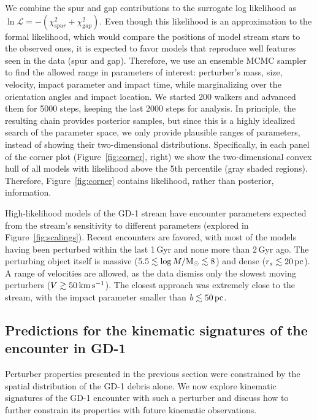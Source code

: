\documentclass[twocolumn]{aastex62}
\begin{document}
We combine the spur and gap contributions to the surrogate log likelihood as $\ln\mathcal{L} = -(\chi^2_{\mathrm spur} + \chi^2_{\mathrm gap})$.
Even though this likelihood is an approximation to the formal likelihood, which would compare the positions of model stream stars to the observed ones, it is expected to favor models that reproduce well features seen in the data (spur and gap).
Therefore, we use an ensemble MCMC sampler \citep{Foreman-Mackey:2013} to find the allowed range in parameters of interest: perturber's mass, size, velocity, impact parameter and impact time, while marginalizing over the orientation angles and impact location.
We started 200 walkers and advanced them for 5000 steps, keeping the last 2000 steps for analysis.
In principle, the resulting chain provides posterior samples, but since this is a highly idealized search of the parameter space, we only provide plausible ranges of parameters, instead of showing their two-dimensional distributions.
Specifically, in each panel of the corner plot (Figure~\ref{fig:corner}, right) we show the two-dimensional convex hull of all models with likelihood above the 5th percentile (gray shaded regions).
Therefore, Figure~\ref{fig:corner} contains likelihood, rather than posterior, information.

High-likelihood models of the GD-1 stream have encounter parameters expected from the stream's sensitivity to different parameters (explored in Figure~\ref{fig:scalings}).
Recent encounters are favored, with most of the models having been perturbed within the last 1\,Gyr and none more than 2\,Gyr ago.
The perturbing object itself is massive ($5.5\lesssim\log M/\rm M_\odot\lesssim8$) and dense ($r_s\lesssim20\,\rm pc$).
A range of velocities are allowed, as the data dismiss only the slowest moving perturbers ($V\gtrsim50\,\rm km\,s^{-1}$).
The closest approach was extremely close to the stream, with the impact parameter smaller than $b\lesssim50\rm\,pc$.


\subsection{Predictions for the kinematic signatures of the encounter in GD-1}
\label{sec:kinematics}
Perturber properties presented in the previous section were constrained by the spatial distribution of the GD-1 debris alone.
We now explore kinematic signatures of the GD-1 encounter with such a perturber and discuss how to further constrain its properties with future kinematic observations.
\end{document}
